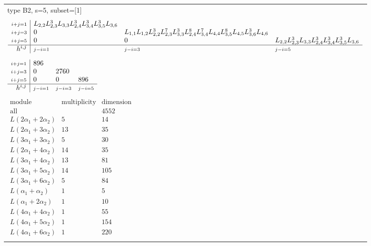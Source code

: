 \documentclass[crop,border=2mm]{standalone}
\begin{document}
\begin{tabular}{l}
{\huge type B2, s=5, subset=[1]}\\ \\


$\displaystyle
\begin{array}{r|l l l}
	{\scriptstyle i+j=1}&L_{2,2}L_{2,3}^{3}L_{3,3}L_{2,4}^{3}L_{3,4}^{3}L_{3,5}^{3}L_{3,6}&&\\
	{\scriptstyle i+j=3}&0&L_{1,1}L_{1,2}L_{2,2}^{3}L_{2,3}^{7}L_{3,3}^{3}L_{2,4}^{8}L_{3,4}^{7}L_{4,4}L_{3,5}^{8}L_{4,5}L_{3,6}^{3}L_{4,6}&\\
	{\scriptstyle i+j=5}&0&0&L_{2,2}L_{2,3}^{3}L_{3,3}L_{2,4}^{3}L_{3,4}^{3}L_{3,5}^{3}L_{3,6}\\
	\hline h^{i,j}&{\scriptstyle j-i=1}&{\scriptstyle j-i=3}&{\scriptstyle j-i=5}
\end{array}
$ \\ \\


$\displaystyle
\begin{array}{r|l l l}
	{\scriptstyle i+j=1}&896&&\\
	{\scriptstyle i+j=3}&0&2760&\\
	{\scriptstyle i+j=5}&0&0&896\\
	\hline h^{i,j}&{\scriptstyle j-i=1}&{\scriptstyle j-i=3}&{\scriptstyle j-i=5}
\end{array}
$ \\ \\


$\displaystyle
\begin{array}{rll}
	\text{module}&\text{multiplicity}&\text{dimension} \\ \hline \text{all}&&4552 \\
	L\left( 2\alpha_{1}+ 2\alpha_{2}\right)&5&14\\
	L\left( 2\alpha_{1}+ 3\alpha_{2}\right)&13&35\\
	L\left( 3\alpha_{1}+ 3\alpha_{2}\right)&5&30\\
	L\left( 2\alpha_{1}+ 4\alpha_{2}\right)&14&35\\
	L\left( 3\alpha_{1}+ 4\alpha_{2}\right)&13&81\\
	L\left( 3\alpha_{1}+ 5\alpha_{2}\right)&14&105\\
	L\left( 3\alpha_{1}+ 6\alpha_{2}\right)&5&84\\
	L\left(\alpha_{1}+\alpha_{2}\right)&1&5\\
	L\left(\alpha_{1}+ 2\alpha_{2}\right)&1&10\\
	L\left( 4\alpha_{1}+ 4\alpha_{2}\right)&1&55\\
	L\left( 4\alpha_{1}+ 5\alpha_{2}\right)&1&154\\
	L\left( 4\alpha_{1}+ 6\alpha_{2}\right)&1&220
\end{array}
$ \\ \\

\end{tabular}
\end{document}

